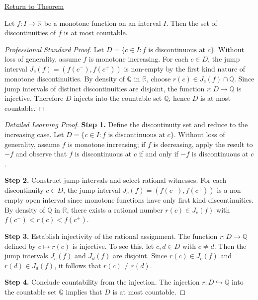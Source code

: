 \newpage
{}
\label{prf:monotone-discontinuities-countable}

\begin{remark*}[Return]
\hyperref[thm:monotone-discontinuities-countable]{Return to Theorem}
\end{remark*}

\begin{theorem*}
Let $f : I \to \mathbb{R}$ be a monotone function on an interval $I$. Then the set of discontinuities of $f$ is at most countable.
\end{theorem*}

\begin{proof}[Professional Standard Proof]
\LRAProofBodyStart
Let $D = \{c \in I : f \text{ is discontinuous at } c\}$. Without loss of generality, assume $f$ is monotone increasing. For each $c \in D$, the jump interval $J_c(f) = (f(c^{-}), f(c^{+}))$ is non-empty by the first kind nature of monotone discontinuities. By density of $\mathbb{Q}$ in $\mathbb{R}$, choose $r(c) \in J_c(f) \cap \mathbb{Q}$. Since jump intervals of distinct discontinuities are disjoint, the function $r : D \to \mathbb{Q}$ is injective. Therefore $D$ injects into the countable set $\mathbb{Q}$, hence $D$ is at most countable.
\end{proof}

\begin{proof}[Detailed Learning Proof]
\LRAProofBodyStart

\textbf{Step 1.} Define the discontinuity set and reduce to the increasing case. Let $D = \{c \in I : f \text{ is discontinuous at } c\}$. Without loss of generality, assume $f$ is monotone increasing; if $f$ is decreasing, apply the result to $-f$ and observe that $f$ is discontinuous at $c$ if and only if $-f$ is discontinuous at $c$.

\textbf{Step 2.} Construct jump intervals and select rational witnesses. For each discontinuity $c \in D$, the jump interval $J_c(f) = (f(c^{-}), f(c^{+}))$ is a non-empty open interval since monotone functions have only first kind discontinuities. By density of $\mathbb{Q}$ in $\mathbb{R}$, there exists a rational number $r(c) \in J_c(f)$ with $f(c^{-}) < r(c) < f(c^{+})$.

\textbf{Step 3.} Establish injectivity of the rational assignment. The function $r : D \to \mathbb{Q}$ defined by $c \mapsto r(c)$ is injective. To see this, let $c, d \in D$ with $c \neq d$. Then the jump intervals $J_c(f)$ and $J_d(f)$ are disjoint. Since $r(c) \in J_c(f)$ and $r(d) \in J_d(f)$, it follows that $r(c) \neq r(d)$.

\textbf{Step 4.} Conclude countability from the injection. The injection $r : D \hookrightarrow \mathbb{Q}$ into the countable set $\mathbb{Q}$ implies that $D$ is at most countable.
\end{proof}

